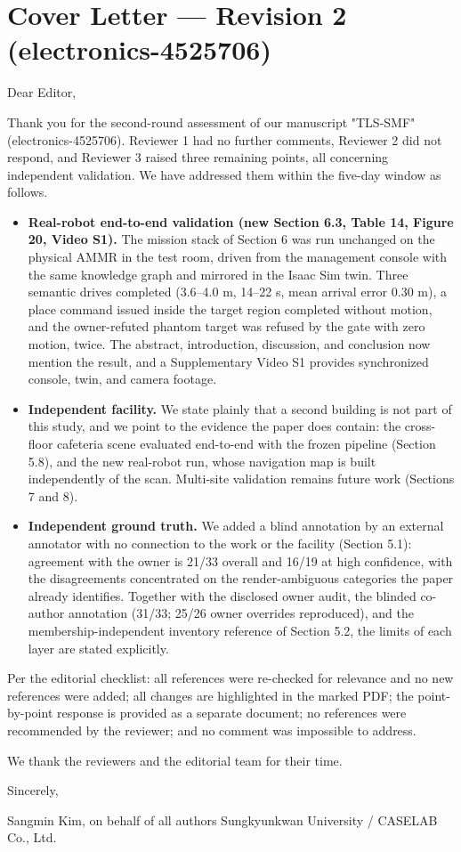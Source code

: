 \documentclass[11pt]{article}
\begin{document}
\section*{Cover Letter --- Revision 2 (electronics-4525706)}

Dear Editor,

Thank you for the second-round assessment of our manuscript "TLS-SMF" (electronics-4525706). Reviewer 1 had no further comments, Reviewer 2 did not respond, and Reviewer 3 raised three remaining points, all concerning independent validation. We have addressed them within the five-day window as follows.

\begin{itemize}
\item \textbf{Real-robot end-to-end validation (new Section 6.3, Table 14, Figure 20, Video S1).} The mission stack of Section 6 was run unchanged on the physical AMMR in the test room, driven from the management console with the same knowledge graph and mirrored in the Isaac Sim twin. Three semantic drives completed (3.6--4.0 m, 14--22 s, mean arrival error 0.30 m), a place command issued inside the target region completed without motion, and the owner-refuted phantom target was refused by the gate with zero motion, twice. The abstract, introduction, discussion, and conclusion now mention the result, and a Supplementary Video S1 provides synchronized console, twin, and camera footage.
\item \textbf{Independent facility.} We state plainly that a second building is not part of this study, and we point to the evidence the paper does contain: the cross-floor cafeteria scene evaluated end-to-end with the frozen pipeline (Section 5.8), and the new real-robot run, whose navigation map is built independently of the scan. Multi-site validation remains future work (Sections 7 and 8).
\item \textbf{Independent ground truth.} We added a blind annotation by an external annotator with no connection to the work or the facility (Section 5.1): agreement with the owner is 21/33 overall and 16/19 at high confidence, with the disagreements concentrated on the render-ambiguous categories the paper already identifies. Together with the disclosed owner audit, the blinded co-author annotation (31/33; 25/26 owner overrides reproduced), and the membership-independent inventory reference of Section 5.2, the limits of each layer are stated explicitly.
\end{itemize}

Per the editorial checklist: all references were re-checked for relevance and no new references were added; all changes are highlighted in the marked PDF; the point-by-point response is provided as a separate document; no references were recommended by the reviewer; and no comment was impossible to address.

We thank the reviewers and the editorial team for their time.

Sincerely,

Sangmin Kim, on behalf of all authors Sungkyunkwan University / CASELAB Co., Ltd.
\end{document}
